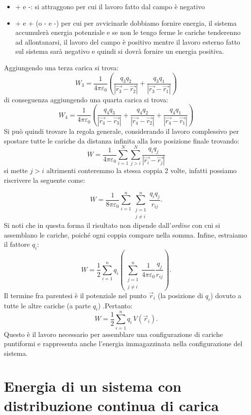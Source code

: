 \documentclass{book}
\begin{document}
\begin{itemize}
    \item + e -: si attraggono per cui il lavoro fatto dal campo è negativo 
    \item + e + (o - e -) per cui per avvicinarle dobbiamo fornire energia, il sistema accumulerà energia potenziale e se non le tengo ferme le cariche tenderenno ad allontanarsi, il lavoro del campo è positivo mentre il lavoro esterno fatto sul sistema sarà negativo e quindi si dovrà fornire un energia positiva.
\end{itemize}
Aggiungendo una terza carica si trova: 
$$
W_3=  \frac{1}{4\pi   \varepsilon_0} \left( \frac{q_3 q_2}{|\vec{r_3}-\vec{r_2}|} + \frac{q_3 q_1}{|\vec{r_3}-\vec{r_1}|} \right)
$$
di conseguenza aggiungendo una quarta carica si trova: 
$$
W_4=  \frac{1}{4\pi   \varepsilon_0} \left( \frac{q_4 q_3}{|\vec{r_4}-\vec{r_3}|} + \frac{q_4 q_2}{|\vec{r_4}-\vec{r_2}|} + \frac{q_4 q_1}{|\vec{r_4}-\vec{r_1}|}  \right)
$$
Si può quindi trovare la regola generale, considerando il lavoro complessivo per spostare tutte le cariche da distanza infinita alla loro posizione finale trovando:
$$
W= \frac{1}{4\pi   \varepsilon_0} \sum_{i=1}^{N} \sum_{j>i}^{N}\frac{q_i q_j}{|\vec{r_i}-\vec{r_j}|}
$$
si mette $j > i$ altrimenti conteremmo la stessa coppia 2 volte, infatti possiamo riscrivere la seguente come:

\[
W = \frac{1}{8\pi\varepsilon_0}\sum_{i=1}^n\sum_{\substack{j=1\\ j\neq i}}^n \frac{q_i q_j}{r_{ij}}.
\]
 Si noti che in questa forma il risultato non dipende dall'\emph{ordine} con cui si assemblano le cariche, poiché ogni coppia compare nella somma.
 Infine, estraiamo il fattore \(q_i\):
\[
W = \frac{1}{2}\sum_{i=1}^n q_i\!\left(\sum_{\substack{j=1\\ j\neq i}}^n \frac{1}{4\pi\varepsilon_0}\frac{q_j}{r_{ij}}\right).
\]
 Il termine fra parentesi è il potenziale nel punto \(\vec{r}_i\) (la posizione di \(q_i\)) dovuto a tutte le altre cariche (a parte $q_i$) .Pertanto:
\[
W = \frac{1}{2}\sum_{i=1}^n q_i\,V(\vec{r}_i).
\]
Questo è il lavoro  necessario per assemblare una configurazione di cariche puntiformi e rappresenta anche l'energia immagazzinata nella configurazione del sistema.


\section{Energia di un sistema con distribuzione continua di carica}
\end{document}
